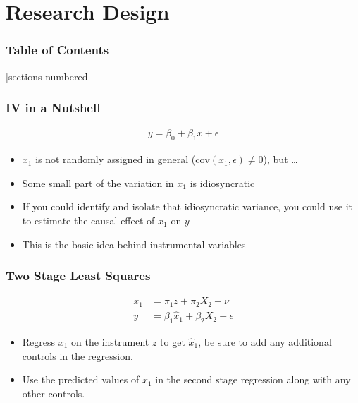 \documentclass[serif, 9pt, aspectratio=32]{beamer}
\begin{document}




\section{Research Design}

\begin{frame}
    \frametitle{Table of Contents}
    [sections numbered]
    \tableofcontents[currentsection]
\end{frame}

\begin{frame}
    \frametitle{IV in a Nutshell}
    \begin{align}
        y = \beta_0 + \beta_1 x + \epsilon
    \end{align}
    \begin{itemize}
        \setlength{\itemsep}{2em}
        \item \(x_1\) is not randomly assigned in general (\(\text{cov}(x_1, \epsilon) \neq 0\)), but \dots
        \item Some small part of the variation in \(x_1\) is idiosyncratic
        \item If you could identify and isolate that idiosyncratic variance, you could use it to estimate the causal effect of \(x_1\) on \(y\)
        \item This is the basic idea behind instrumental variables
    \end{itemize}
\end{frame}

\begin{frame}
    \frametitle{Two Stage Least Squares}
    \begin{align}
        x_1 & = \pi_1 z + \pi_2 X_2 + \nu                  \\
        y   & = \beta_1 \hat{x}_1 + \beta_2 X_2 + \epsilon
    \end{align}
    \begin{itemize}
        \setlength{\itemsep}{2em}
        \item Regress \(x_1\) on the instrument \(z\) to get \(\hat{x}_1\), be sure to add any additional controls in the regression.
        \item Use the predicted values of \(x_1\) in the second stage regression along with any other controls.
    \end{itemize}
\end{frame}
\end{document}
